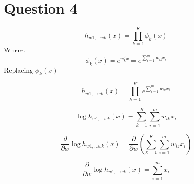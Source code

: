 \documentclass{report}
\begin{document}
\section*{Question 4}

  \begin{equation}
    h_{w1,...wk}(x)
    = \prod_{k=1}^{K}\phi_k(x)
  \end{equation}
Where:
  \begin{equation}
    \phi_k(x) = e^{w_k^Tx}
    = e^{\sum_{i=1}^m w_{ik}x_i}
  \end{equation}
Replacing $\phi_k(x)$

  \begin{equation}
    h_{w1,...wk}(x)
    = \prod_{k=1}^{K}e^{\sum_{i=1}^m w_{ik}x_i}
  \end{equation}

  \begin{equation}
    \log h_{w1,...wk}(x)
    = \sum_{k=1}^{K} \sum_{i=1}^m w_{ik}x_i
  \end{equation}

  \begin{equation}
    \frac{\partial}{\partial w} \log h_{w1,...wk}(x)
    = \frac{\partial}{\partial w} \left(\sum_{k=1}^{K} \sum_{i=1}^m w_{ik}x_i\right)
  \end{equation}

  \begin{equation}
    \frac{\partial}{\partial w} \log h_{w1,...wk}(x)
    =  \sum_{i=1}^m x_i
  \end{equation}
\end{document}
